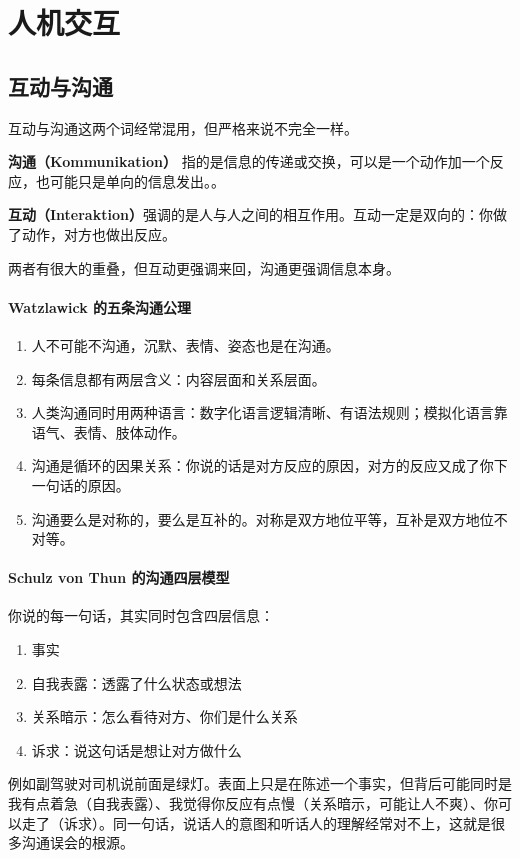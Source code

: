 \section{人机交互}

\subsection{互动与沟通}
\label{subsec:kommunikation}

互动与沟通这两个词经常混用，但严格来说不完全一样。

\textbf{沟通（Kommunikation）} 指的是信息的传递或交换，可以是一个动作加一个反应，也可能只是单向的信息发出。。

\textbf{互动（Interaktion）}强调的是人与人之间的相互作用。互动一定是双向的：你做了动作，对方也做出反应。

两者有很大的重叠，但互动更强调来回，沟通更强调信息本身。

\paragraph{Watzlawick 的五条沟通公理}

\begin{enumerate}
    \item 人不可能不沟通，沉默、表情、姿态也是在沟通。
    \item 每条信息都有两层含义：内容层面和关系层面。
    \item 人类沟通同时用两种语言：数字化语言逻辑清晰、有语法规则；模拟化语言靠语气、表情、肢体动作。
    \item 沟通是循环的因果关系：你说的话是对方反应的原因，对方的反应又成了你下一句话的原因。
    \item 沟通要么是对称的，要么是互补的。对称是双方地位平等，互补是双方地位不对等。
\end{enumerate}

\paragraph{Schulz von Thun 的沟通四层模型}

你说的每一句话，其实同时包含四层信息：
\begin{enumerate}
    \item 事实
    \item 自我表露：透露了什么状态或想法
    \item 关系暗示：怎么看待对方、你们是什么关系
    \item 诉求：说这句话是想让对方做什么
\end{enumerate}
例如副驾驶对司机说前面是绿灯。表面上只是在陈述一个事实，但背后可能同时是我有点着急（自我表露）、我觉得你反应有点慢（关系暗示，可能让人不爽）、你可以走了（诉求）。同一句话，说话人的意图和听话人的理解经常对不上，这就是很多沟通误会的根源。

